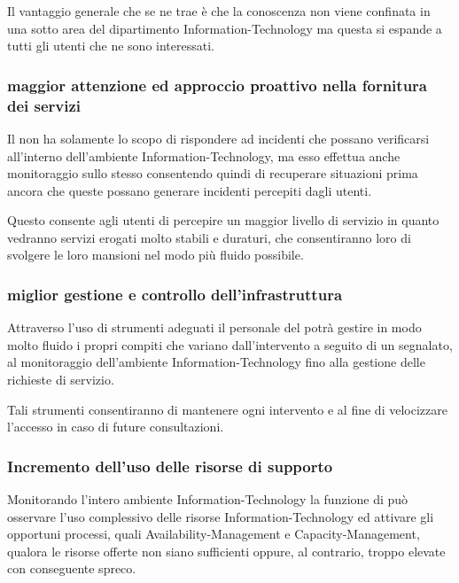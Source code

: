 Il vantaggio generale che se ne trae è che la conoscenza non viene confinata in una sotto area del dipartimento \acs{Information-Technology} ma questa si espande a tutti gli utenti che ne sono interessati.

\subsubsection[Maggior attenzione ed approccio proattivo nella fonrnitura dei servizi]{maggior attenzione ed approccio proattivo nella fornitura dei servizi}
Il  non ha solamente lo scopo di rispondere ad incidenti che possano verificarsi all'interno dell'ambiente \acs{Information-Technology}, ma esso effettua anche monitoraggio sullo stesso consentendo quindi di recuperare situazioni prima ancora che queste possano generare incidenti percepiti dagli utenti.

Questo consente agli utenti di percepire un maggior livello di servizio in quanto vedranno servizi erogati molto stabili e duraturi, che consentiranno loro di svolgere le loro mansioni nel modo più fluido possibile.

\subsubsection[Miglior gestione e controllo dell'infrastruttura]{miglior gestione e controllo dell'infrastruttura}
Attraverso l'uso di strumenti adeguati il personale del  potrà gestire in modo molto fluido i propri compiti che variano dall'intervento a seguito di un  segnalato, al monitoraggio dell'ambiente \acs{Information-Technology} fino alla gestione delle richieste di servizio.

Tali strumenti consentiranno di mantenere ogni intervento  e  al fine di velocizzare l'accesso in caso di future consultazioni.

\subsubsection[Incremento dell'uso delle risorse di supporto]{Incremento dell'uso delle risorse di supporto}
Monitorando l'intero ambiente \acs{Information-Technology} la funzione di  può osservare l'uso complessivo delle risorse \acs{Information-Technology} ed attivare gli opportuni processi, quali \ac{Availability-Management} e \ac{Capacity-Management}, qualora le risorse offerte non siano sufficienti oppure, al contrario, troppo elevate con conseguente spreco.

